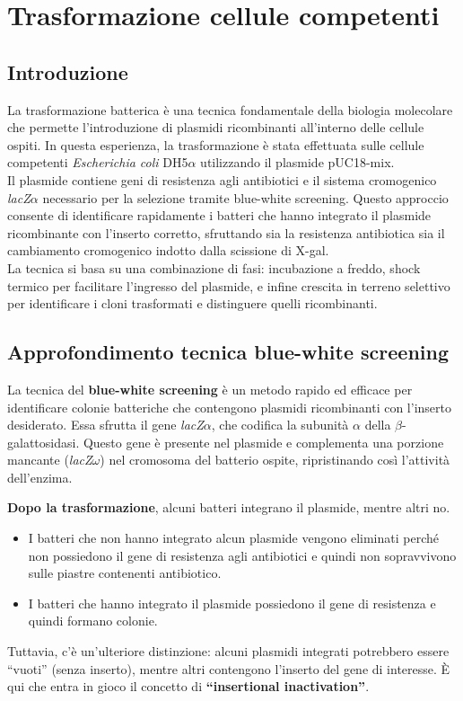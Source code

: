 \section {Trasformazione cellule competenti}
\subsection{Introduzione}
La trasformazione batterica è una tecnica fondamentale della biologia molecolare che permette l’introduzione di plasmidi ricombinanti all’interno delle cellule ospiti. In questa esperienza, la trasformazione è stata effettuata sulle cellule competenti \textit{Escherichia coli} DH5$\alpha$ utilizzando il plasmide pUC18-mix.\\
Il plasmide contiene geni di resistenza agli antibiotici e il sistema cromogenico \textit{lacZ$\alpha$} necessario per la selezione tramite blue-white screening. Questo approccio consente di identificare rapidamente i batteri che hanno integrato il plasmide ricombinante con l’inserto corretto, sfruttando sia la resistenza antibiotica sia il cambiamento cromogenico indotto dalla scissione di X-gal.\\
La tecnica si basa su una combinazione di fasi: incubazione a freddo, shock termico per facilitare l’ingresso del plasmide, e infine crescita in terreno selettivo per identificare i cloni trasformati e distinguere quelli ricombinanti.

\subsection{Approfondimento tecnica blue-white screening}

La tecnica del \textbf{blue-white screening} è un metodo rapido ed efficace per identificare colonie batteriche che contengono plasmidi ricombinanti con l’inserto desiderato. Essa sfrutta il gene \textit{lacZ$\alpha$}, che codifica la subunità $\alpha$ della $\beta$-galattosidasi. Questo gene è presente nel plasmide e complementa una porzione mancante (\textit{lacZ$\omega$}) nel cromosoma del batterio ospite, ripristinando così l’attività dell’enzima.

\vspace{0.5em}

\textbf{Dopo la trasformazione}, alcuni batteri integrano il plasmide, mentre altri no.
\begin{itemize}\footnotesize
	\item I batteri che non hanno integrato alcun plasmide vengono eliminati perché non possiedono il gene di resistenza agli antibiotici e quindi non sopravvivono sulle piastre contenenti antibiotico.
	\item I batteri che hanno integrato il plasmide possiedono il gene di resistenza e quindi formano colonie.
\end{itemize}
\vspace{0.5em}
Tuttavia, c’è un’ulteriore distinzione: alcuni plasmidi integrati potrebbero essere “vuoti” (senza inserto), mentre altri contengono l’inserto del gene di interesse. È qui che entra in gioco il concetto di \textbf{“insertional inactivation”}.

